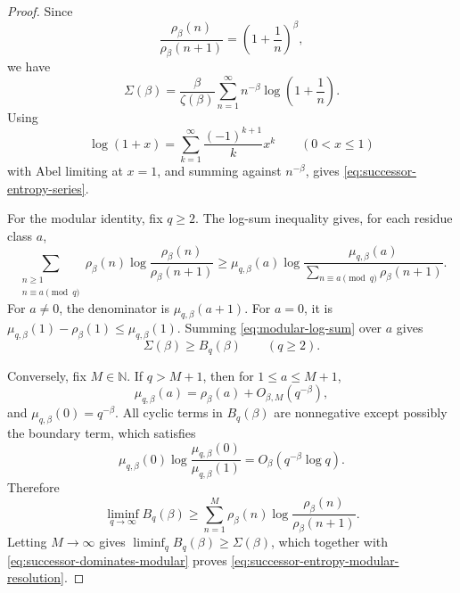 \documentclass[11pt]{article}
\numberwithin{equation}{section}
\theoremstyle{definition}
\theoremstyle{remark}
\newcommand{\N}{\mathbb N}
\newcommand{\1}{\mathbf 1}
\begin{document}
\begin{proof}
Since
\begin{equation}
\label{eq:successor-ratio}
\frac{\rho_\beta(n)}{\rho_\beta(n+1)}
=\left(1+\frac1n\right)^\beta,
\end{equation}
we have
\begin{equation}
\label{eq:successor-entropy-log-sum}
\Sigma(\beta)=\frac{\beta}{\zeta(\beta)}
\sum_{n=1}^{\infty}n^{-\beta}\log\left(1+\frac1n\right).
\end{equation}
Using
\begin{equation}
\label{eq:log-series}
\log(1+x)=\sum_{k=1}^{\infty}\frac{(-1)^{k+1}}{k}x^k
\qquad(0<x\le1)
\end{equation}
with Abel limiting at \(x=1\), and summing against \(n^{-\beta}\), gives \eqref{eq:successor-entropy-series}.

For the modular identity, fix \(q\ge2\).  The log-sum inequality gives, for each residue class \(a\),
\begin{equation}
\label{eq:modular-log-sum}
\sum_{\substack{n\ge1\\ n\equiv a\pmod q}}
\rho_\beta(n)\log\frac{\rho_\beta(n)}{\rho_\beta(n+1)}
\ge
\mu_{q,\beta}(a)
\log\frac{\mu_{q,\beta}(a)}
{\sum_{n\equiv a\pmod q}\rho_\beta(n+1)}.
\end{equation}
For \(a\ne0\), the denominator is \(\mu_{q,\beta}(a+1)\).  For \(a=0\), it is \(\mu_{q,\beta}(1)-\rho_\beta(1)\le\mu_{q,\beta}(1)\).  Summing \eqref{eq:modular-log-sum} over \(a\) gives
\begin{equation}
\label{eq:successor-dominates-modular}
\Sigma(\beta)\ge B_q(\beta)
\qquad(q\ge2).
\end{equation}

Conversely, fix \(M\in\N\).  If \(q>M+1\), then for \(1\le a\le M+1\),
\begin{equation}
\label{eq:residue-isolation}
\mu_{q,\beta}(a)=\rho_\beta(a)+O_{\beta,M}(q^{-\beta}),
\end{equation}
and \(\mu_{q,\beta}(0)=q^{-\beta}\).  All cyclic terms in \(B_q(\beta)\) are nonnegative except possibly the boundary term, which satisfies
\begin{equation}
\label{eq:boundary-term}
\mu_{q,\beta}(0)\log\frac{\mu_{q,\beta}(0)}{\mu_{q,\beta}(1)}
=O_\beta(q^{-\beta}\log q).
\end{equation}
Therefore
\begin{equation}
\label{eq:modular-liminf}
\liminf_{q\to\infty}B_q(\beta)
\ge
\sum_{n=1}^{M}\rho_\beta(n)\log\frac{\rho_\beta(n)}{\rho_\beta(n+1)}.
\end{equation}
Letting \(M\to\infty\) gives \(\liminf_qB_q(\beta)\ge\Sigma(\beta)\), which together with \eqref{eq:successor-dominates-modular} proves \eqref{eq:successor-entropy-modular-resolution}.
\end{proof}
\end{document}
